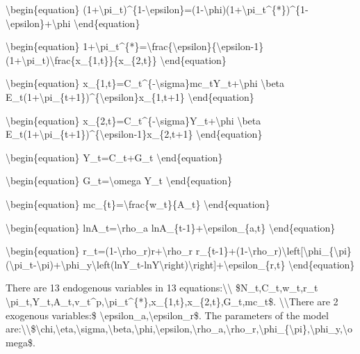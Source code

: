 \documentclass[10pt,math=newtx,citestyle=gb7714-2015,bibstyle=gb7714-2015]{elegantbook}
\begin{document}
	\textbackslash{}begin\{equation\}
	(1+\textbackslash{}pi\_t)\^{}\{1-\textbackslash{}epsilon\}=(1-\textbackslash{}phi)(1+\textbackslash{}pi\_t\^{}\{*\})\^{}\{1-\textbackslash{}epsilon\}+\textbackslash{}phi
	\textbackslash{}end\{equation\}
	
	\textbackslash{}begin\{equation\}
	1+\textbackslash{}pi\_t\^{}\{*\}=\textbackslash{}frac\{\textbackslash{}epsilon\}\{\textbackslash{}epsilon-1\}(1+\textbackslash{}pi\_t)\textbackslash{}frac\{x\_\{1,t\}\}\{x\_\{2,t\}\}
	\textbackslash{}end\{equation\}
	
	\textbackslash{}begin\{equation\}
	x\_\{1,t\}=C\_t\^{}\{-\textbackslash{}sigma\}mc\_tY\_t+\textbackslash{}phi \textbackslash{}beta E\_t(1+\textbackslash{}pi\_\{t+1\})\^{}\{\textbackslash{}epsilon\}x\_\{1,t+1\}
	\textbackslash{}end\{equation\}
	
	\textbackslash{}begin\{equation\}
	x\_\{2,t\}=C\_t\^{}\{-\textbackslash{}sigma\}Y\_t+\textbackslash{}phi \textbackslash{}beta E\_t(1+\textbackslash{}pi\_\{t+1\})\^{}\{\textbackslash{}epsilon-1\}x\_\{2,t+1\}
	\textbackslash{}end\{equation\}
	
	\textbackslash{}begin\{equation\}
	Y\_t=C\_t+G\_t
	\textbackslash{}end\{equation\}
	
	\textbackslash{}begin\{equation\}
	G\_t=\textbackslash{}omega Y\_t
	\textbackslash{}end\{equation\}
	
	\textbackslash{}begin\{equation\}
	mc\_\{t\}=\textbackslash{}frac\{w\_t\}\{A\_t\}
	\textbackslash{}end\{equation\}
	
	\textbackslash{}begin\{equation\}
	lnA\_t=\textbackslash{}rho\_a lnA\_\{t-1\}+\textbackslash{}epsilon\_\{a,t\}
	\textbackslash{}end\{equation\}
	
	\textbackslash{}begin\{equation\}
	r\_t=(1-\textbackslash{}rho\_r)r+\textbackslash{}rho\_r r\_\{t-1\}+(1-\textbackslash{}rho\_r)\textbackslash{}left[\textbackslash{}phi\_\{\textbackslash{}pi\}(\textbackslash{}pi\_t-\textbackslash{}pi)+\textbackslash{}phi\_y\textbackslash{}left(lnY\_t-lnY\textbackslash{}right)\textbackslash{}right]+\textbackslash{}epsilon\_\{r,t\}
	\textbackslash{}end\{equation\}
	
	There are 13 endogenous variables in 13 equations:\textbackslash{}\textbackslash{} \$N\_t,C\_t,w\_t,r\_t \textbackslash{}pi\_t,Y\_t,A\_t,v\_t\^{}p,\textbackslash{}pi\_t\^{}\{*\},x\_\{1,t\},x\_\{2,t\},G\_t,mc\_t\$. \textbackslash{}\textbackslash{}There are 2 exogenous variables:\$ \textbackslash{}epsilon\_a,\textbackslash{}epsilon\_r\$. The parameters of the model are:\textbackslash{}\textbackslash{}\$\textbackslash{}chi,\textbackslash{}eta,\textbackslash{}sigma,\textbackslash{}beta,\textbackslash{}phi,\textbackslash{}epsilon,\textbackslash{}rho\_a,\textbackslash{}rho\_r,\textbackslash{}phi\_\{\textbackslash{}pi\},\textbackslash{}phi\_y,\textbackslash{}omega\$.
	
\end{document}
